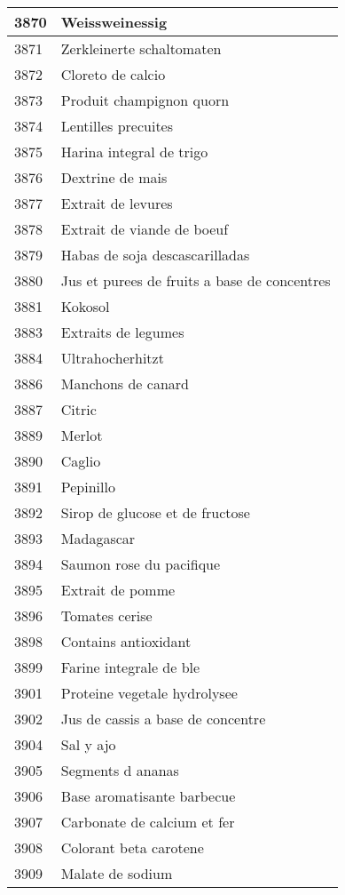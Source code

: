 \begin{longtable}{|l|l|}
3870 & Weissweinessig \\ \hline 
3871 & Zerkleinerte schaltomaten \\ \hline 
3872 & Cloreto de calcio \\ \hline 
3873 & Produit champignon quorn \\ \hline 
3874 & Lentilles precuites \\ \hline 
3875 & Harina integral de trigo \\ \hline 
3876 & Dextrine de mais \\ \hline 
3877 & Extrait de levures \\ \hline 
3878 & Extrait de viande de boeuf \\ \hline 
3879 & Habas de soja descascarilladas \\ \hline 
3880 & Jus et purees de fruits a base de concentres \\ \hline 
3881 & Kokosol \\ \hline 
3883 & Extraits de legumes \\ \hline 
3884 & Ultrahocherhitzt \\ \hline 
3886 & Manchons de canard \\ \hline 
3887 & Citric \\ \hline 
3889 & Merlot \\ \hline 
3890 & Caglio \\ \hline 
3891 & Pepinillo \\ \hline 
3892 & Sirop de glucose et de fructose \\ \hline 
3893 & Madagascar \\ \hline 
3894 & Saumon rose du pacifique \\ \hline 
3895 & Extrait de pomme \\ \hline 
3896 & Tomates cerise \\ \hline 
3898 & Contains antioxidant \\ \hline 
3899 & Farine integrale de ble \\ \hline 
3901 & Proteine vegetale hydrolysee \\ \hline 
3902 & Jus de cassis a base de concentre \\ \hline 
3904 & Sal y ajo \\ \hline 
3905 & Segments d ananas \\ \hline 
3906 & Base aromatisante barbecue \\ \hline 
3907 & Carbonate de calcium et fer \\ \hline 
3908 & Colorant beta carotene \\ \hline 
3909 & Malate de sodium \\ \hline 

\end{longtable}
